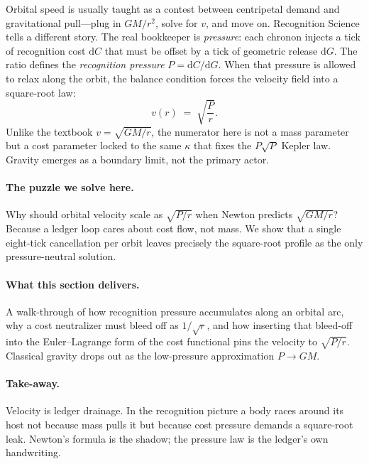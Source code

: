 \documentclass[11pt,oneside]{book}
\begin{document}
Orbital speed is usually taught as a contest between centripetal
demand and gravitational pull—plug in $GM/r^{2}$, solve for $v$, and
move on.  
Recognition Science tells a different story.  The real bookkeeper is
\emph{pressure}: each chronon injects a tick of recognition cost
$\mathrm dC$ that must be offset by a tick of geometric release
$\mathrm dG$.  The ratio defines the \emph{recognition pressure}
$P=\mathrm dC/\mathrm dG$.  When that pressure is allowed to relax
along the orbit, the balance condition forces the velocity field into
a square-root law:
\[
   v(r)
   \;=\;
   \sqrt{\frac{P}{r}}.
\]
Unlike the textbook $v=\sqrt{GM/r}$, the numerator here is not a mass
parameter but a cost parameter locked to the same $\kappa$ that fixes
the $P\sqrt{P}$ Kepler law.  Gravity emerges as a boundary limit,
not the primary actor.

\paragraph{The puzzle we solve here.}
Why should orbital velocity scale as $\sqrt{P/r}$ when Newton
predicts $\sqrt{GM/r}$?  
Because a ledger loop cares about cost flow, not mass.  We show that a
single eight-tick cancellation per orbit leaves precisely the
square-root profile as the only pressure-neutral solution.

\paragraph{What this section delivers.}
A walk-through of how recognition pressure accumulates along
an orbital arc, why a cost neutralizer must bleed off as $1/\sqrt{r}$,
and how inserting that bleed-off into the Euler–Lagrange form of the
cost functional pins the velocity to $\sqrt{P/r}$.  Classical gravity
drops out as the low-pressure approximation $P\to GM$.

\paragraph{Take-away.}
Velocity is ledger drainage.  In the recognition picture a body races
around its host not because mass pulls it but because cost pressure
demands a square-root leak.  Newton’s formula is the shadow; the
pressure law is the ledger’s own handwriting.


\end{document}

